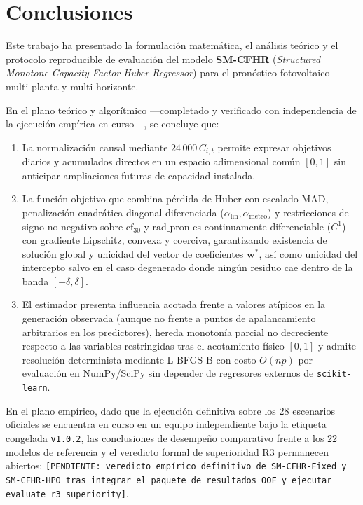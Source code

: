 \section{Conclusiones}\label{sec:conclusiones}

Este trabajo ha presentado la formulación matemática, el análisis teórico y el protocolo reproducible de evaluación del modelo \textbf{SM-CFHR} (\textit{Structured Monotone Capacity-Factor Huber Regressor}) para el pronóstico fotovoltaico multi-planta y multi-horizonte.

En el plano teórico y algorítmico ---completado y verificado con independencia de la ejecución empírica en curso---, se concluye que:
\begin{enumerate}
    \item La normalización causal mediante $24\,000\,C_{i,t}$ permite expresar objetivos diarios y acumulados directos en un espacio adimensional común $[0,1]$ sin anticipar ampliaciones futuras de capacidad instalada.
    \item La función objetivo que combina pérdida de Huber con escalado MAD, penalización cuadrática diagonal diferenciada ($\alpha_{\mathrm{lin}}, \alpha_{\mathrm{meteo}}$) y restricciones de signo no negativo sobre $\mathrm{cf}_{30}$ y $\mathrm{rad\_pron}$ es continuamente diferenciable ($C^1$) con gradiente Lipschitz, convexa y coerciva, garantizando existencia de solución global y unicidad del vector de coeficientes $\mathbf{w}^*$, así como unicidad del intercepto salvo en el caso degenerado donde ningún residuo cae dentro de la banda $[-\delta, \delta]$.
    \item El estimador presenta influencia acotada frente a valores atípicos en la generación observada (aunque no frente a puntos de apalancamiento arbitrarios en los predictores), hereda monotonía parcial no decreciente respecto a las variables restringidas tras el acotamiento físico $[0,1]$ y admite resolución determinista mediante L-BFGS-B con costo $O(np)$ por evaluación en NumPy/SciPy sin depender de regresores externos de \texttt{scikit-learn}.
\end{enumerate}

En el plano empírico, dado que la ejecución definitiva sobre los $28$ escenarios oficiales se encuentra en curso en un equipo independiente bajo la etiqueta congelada \texttt{v1.0.2}, las conclusiones de desempeño comparativo frente a los $22$ modelos de referencia y el veredicto formal de superioridad R3 permanecen abiertos: \texttt{[PENDIENTE: veredicto empírico definitivo de SM-CFHR-Fixed y SM-CFHR-HPO tras integrar el paquete de resultados OOF y ejecutar evaluate\_r3\_superiority]}.
